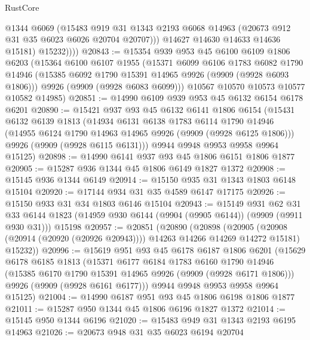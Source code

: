 \begin{lexlean}{RustCore}
\begin{coremodule}
                @1344
                @6069
                (@15483
                  @919
                  @31
                  @1343
                  @2193
                  @6068
                  @14963
                  (@20673 @912 @31 @35 @6023 @6026 @20704 @20707)))
              @14627
              @14630
              @14633
              @14636
              @15181)
            @15232))))
@20843 := @15354
    @939
    @953
    @45
    @6100
    @6109
    @1806
    @6203
    (@15364
      @6100
      @6107
      @1955
      (@15371
        @6099
        @6106
        @1783
        @6082
        @1790
        @14946
        (@15385 @6092 @1790 @15391 @14965 @9926 (@9909 (@9928 @6093 @1806)))
        @9926
        (@9909 (@9928 @6083 @6099)))
      @10567
      @10570
      @10573
      @10577
      @10582
      @14985)
@20851 := @14990 @6109 @939 @953 @45 @6132 @6154 @6178 @6201
@20890 := @15421
    @937
    @93
    @45
    @6132
    @6141
    @1806
    @6154
    (@15431
      @6132
      @6139
      @1813
      (@14934
        @6131
        @6138
        @1783
        @6114
        @1790
        @14946
        (@14955 @6124 @1790 @14963 @14965 @9926 (@9909 (@9928 @6125 @1806)))
        @9926
        (@9909 (@9928 @6115 @6131)))
      @9944
      @9948
      @9953
      @9958
      @9964
      @15125)
@20898 := @14990 @6141 @937 @93 @45 @1806 @6151 @1806 @1877
@20905 := @15287 @936 @1344 @45 @1806 @6149 @1827 @1372
@20908 := @15145 @936 @1344 @6149
@20914 := @15150 @935 @31 @1343 @1803 @6148 @15104
@20920 := @17144 @934 @31 @35 @4589 @6147 @17175
@20926 := @15150 @933 @31 @34 @1803 @6146 @15104
@20943 := @15149
    @931
    @62
    @31
    @33
    @6144
    @1823
    (@14959 @930 @6144 (@9904 (@9905 @6144)) (@9909 (@9911 @930 @31)))
    @15198
@20957 := @20851
    (@20890
      (@20898
        (@20905 (@20908 (@20914 (@20920 (@20926 @20943)))) @14263 @14266 @14269 @14272 @15181)
        @15232))
@20996 := @15619
    @951
    @93
    @45
    @6178
    @6187
    @1806
    @6201
    (@15629
      @6178
      @6185
      @1813
      (@15371
        @6177
        @6184
        @1783
        @6160
        @1790
        @14946
        (@15385 @6170 @1790 @15391 @14965 @9926 (@9909 (@9928 @6171 @1806)))
        @9926
        (@9909 (@9928 @6161 @6177)))
      @9944
      @9948
      @9953
      @9958
      @9964
      @15125)
@21004 := @14990 @6187 @951 @93 @45 @1806 @6198 @1806 @1877
@21011 := @15287 @950 @1344 @45 @1806 @6196 @1827 @1372
@21014 := @15145 @950 @1344 @6196
@21020 := @15483 @949 @31 @1343 @2193 @6195 @14963
@21026 := @20673 @948 @31 @35 @6023 @6194 @20704

\end{coremodule}
\end{lexlean}
